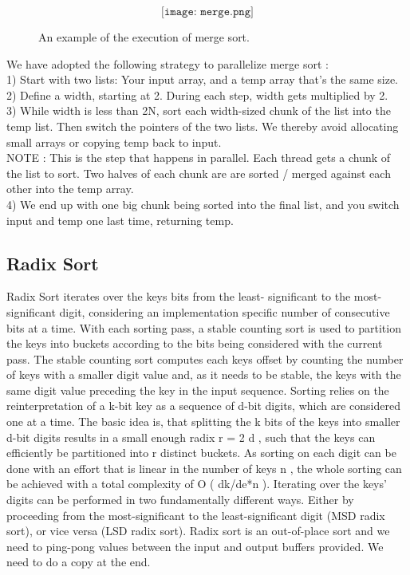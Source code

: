 \documentclass[conference]{IEEEtran}
\begin{document}
\begin{figure}[h]
\[\texttt{[image: merge.png]}\]
\caption{An example of the execution of merge sort.}
\end{figure}

We have adopted the following strategy to parallelize merge sort :\\
1) Start with two lists: Your input array, and a temp array that’s the same size.\\
2) Define a width, starting at 2. During each step, width gets multiplied by 2.\\
3) While width is less than 2N, sort each width-sized chunk of the list into the temp list. Then switch the pointers of the two lists. We thereby avoid allocating small arrays or copying temp back to input.\\

NOTE : This is the step that happens in parallel. Each thread gets a
chunk of the list to sort.
Two halves of each chunk are are sorted / merged against
each other into the temp array.\\

4) We end up with one big chunk being sorted into the final list, and you switch input and temp one last time, returning temp.

\subsection{Radix Sort}
Radix Sort iterates over the keys bits from the least-
significant to the most-significant digit, considering an
implementation specific number of consecutive bits at a time.
With each sorting pass, a stable counting sort is used to partition the keys into buckets according to the bits being
considered with the current pass. The stable counting sort
computes each keys offset by counting the number of keys
with a smaller digit value and, as it needs to be stable,
the keys with the same digit value preceding the key in
the input sequence.
Sorting relies on the reinterpretation of a
k-bit key
as a sequence of
d-bit digits, which are considered one at
a time. The basic idea is, that splitting the
k
bits of the
keys into smaller
d-bit digits results in a small enough radix
r
= 2
d
, such that the keys can efficiently be partitioned
into
r
distinct buckets. As sorting on each digit can be
done with an effort that is linear in the number of keys
n
,
the whole sorting can be achieved with a total complexity of
O
(
dk/de*n
). Iterating over the keys’ digits can be
performed in two fundamentally different ways. Either by
proceeding from the most-significant to the least-significant
digit (MSD radix sort), or vice versa (LSD radix sort). Radix sort is an out-of-place sort and we need to ping-pong
values between the input and output buffers provided. We
need to do a copy at the end.\\
\end{document}
